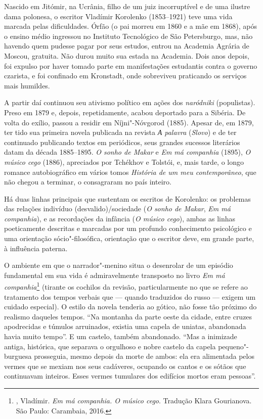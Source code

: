 Nascido em Jitómir, na Ucrânia, filho de um juiz incorruptível e de uma
ilustre dama polonesa, o escritor Vladímir Korolenko (1853--1921) teve
uma vida marcada pelas dificuldades. Órfão (o pai morreu em 1860 e a mãe
em 1868), após o ensino médio ingressou no Instituto Tecnológico de São
Petersburgo, mas, não havendo quem pudesse pagar por seus estudos,
entrou na Academia Agrária de Moscou, gratuita. Não durou muito sua
estada na Academia. Dois anos depois, foi expulso por haver
tomado parte em manifestações estudantis contra o governo czarista, e
foi confinado em Kronstadt, onde sobreviveu praticando os serviços mais
humildes.

A partir daí continuou seu ativismo político em ações dos
\emph{naródniki} (populistas). Preso em 1879 e, depois, repetidamente,
acabou deportado para a Sibéria. De volta do exílio, passou a residir em
Níjni"-Nóvgorod (1885). Apesar de, em 1879, ter tido sua primeira
novela publicada na revista \emph{А palavra} (\emph{Slovo}) e de ter
continuado publicando textos em periódicos, seus grandes sucessos
literários datam da década 1885--1895. \emph{O sonho de Makar} e \emph{Em
má companhia} (1895), \emph{O músico cego} (1886), apreciados por
Tchékhov e Tolstói, e, mais tarde, o longo romance autobiográfico em
vários tomos \emph{História de um meu contemporâneo}, que não chegou a
terminar, o consagraram no país inteiro.

Há duas linhas principais que sustentam os escritos de Korolenko: os
problemas das relações indivíduo (desvalido)/sociedade (\emph{O sonho de
Makar}, \emph{Em má companhia}), e as recordações da infância (\emph{O
músico cego}), ambas as linhas poeticamente descritas e marcadas por um
profundo conhecimento psicológico e uma orientação sócio"-filosófica,
orientação que o escritor deve, em grande parte, à influência paterna.

O ambiente em que o narrador"-menino situa o desenrolar de um episódio
fundamental em sua vida é admiravelmente transposto no livro \emph{Em má
companhia}\footnote{, Vladímir. \emph{Em má companhia. O músico
  cego}. Tradução Klara Gourianova. São Paulo: Carambaia, 2016.} (tirante
os cochilos da revisão, particularmente no que se refere ao tratamento
dos tempos verbais que --- quando traduzidos do russo --- exigem um
cuidado especial). O estilo da novela tenderia ao gótico, não fosse tão
próximo do realismo daqueles tempos. ``Na montanha da parte oeste da
cidade, entre cruzes apodrecidas e túmulos arruinados, existia uma
capela de uniatas, abandonada havia muito tempo''. E um castelo, também
abandonado. ``Mas a inimizade antiga, histórica, que separava o
orgulhoso e nobre castelo da capela pequeno"-burguesa prosseguia, mesmo
depois da morte de ambos: ela era alimentada pelos vermes que se mexiam
nos seus cadáveres, ocupando os cantos e os sótãos que continuavam
inteiros. Esses vermes tumulares dos edifícios mortos eram pessoas''.


